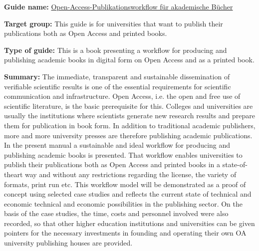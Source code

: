 \documentclass{article}
\begin{document}
\textbf{Guide name:} \href{https://library.oapen.org/bitstream/handle/20.500.12657/22319/9783966270175_Boehm-Grossmann-Reiche-Schrader_Handbuch-OA-Publikationsworkflow.pdf;jsessionid=63C0F28DE7838F3E3F9C83AAB719B6CE?sequence=1}{Open-Access-Publikationsworkflow für akademische Bücher} \autocite{bohm_open-access-publikationsworkflow_2020}


\textbf{Target group: }This guide is for universities that want to publish their publications both as Open Access and printed books.


\textbf{Type of guide: }This is a book presenting a workflow for producing and publishing academic books in digital form on Open Access and as a printed book.


\textbf{Summary: }The immediate, transparent and sustainable dissemination of verifiable scientific results is one of the essential requirements for scientific communication and infrastructure. Open Access, i.e. the open and free use of scientific literature, is the basic prerequisite for this. Colleges and universities are usually the institutions where scientists generate new research results and prepare them for publication in book form. In addition to traditional academic publishers, more and more university presses are therefore publishing academic publications. In the present manual a sustainable and ideal workflow for producing and publishing academic books is presented. That workflow enables universities to publish their publications both as Open Access and printed books in a state-of-theart way and without any restrictions regarding the license, the variety of formats, print run etc. This workflow model will be demonstrated as a proof of concept using selected case studies and reflects the current state of technical and economic technical and economic possibilities in the publishing sector. On the basis of the case studies, the time, costs and personnel involved were also recorded, so that other higher education institutions and universities can be given pointers for the necessary investments in founding and operating their own OA university publishing houses are provided.


\printbibliography[title={Bibliography}]
\end{document}
